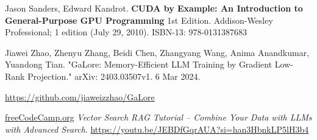 \documentclass[10pt]{amsart}
\begin{document}
\begin{thebibliography}{9}
Jason Sanders, Edward Kandrot.  \textbf{CUDA by Example: An Introduction to General-Purpose GPU Programming} 1st Edition.  Addison-Wesley Professional; 1 edition (July 29, 2010).  ISBN-13: 978-0131387683

Jiawei Zhao, Zhenyu Zhang, Beidi Chen, Zhangyang Wang, Anima Anandkumar, Yuandong Tian. "GaLore: Memory-Efficient LLM Training by Gradient Low-Rank Projection." arXiv: 2403.03507v1. 6 Mar 2024.

\url{https://github.com/jiaweizzhao/GaLore}

\href{https://www.youtube.com/@freecodecamp}{freeCodeCamp.org}  \emph{Vector Search RAG Tutorial – Combine Your Data with LLMs with Advanced Search}. \url{https://youtu.be/JEBDfGqrAUA?si=han3HbnkLP5lH3b4}

  
\end{thebibliography}
\end{document}
